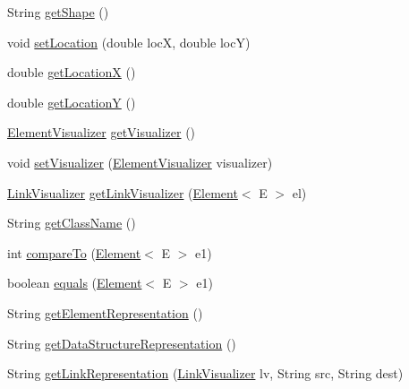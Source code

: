 \begin{DoxyCompactItemize}
\item 
String \mbox{\hyperlink{classbridges_1_1base_1_1_element_aa0fe02d2f5491cf21cc6741f592536a8}{get\+Shape}} ()
\item 
void \mbox{\hyperlink{classbridges_1_1base_1_1_element_a0fe9a52d06e8f3ccc8521e155ec72a27}{set\+Location}} (double locX, double locY)
\item 
double \mbox{\hyperlink{classbridges_1_1base_1_1_element_a57cc1611e0d9cbec9da30d1cdcd3b23d}{get\+LocationX}} ()
\item 
double \mbox{\hyperlink{classbridges_1_1base_1_1_element_a3cfd6af5ca4cae0596845f62018ce004}{get\+LocationY}} ()
\item 
\mbox{\hyperlink{classbridges_1_1base_1_1_element_visualizer}{Element\+Visualizer}} \mbox{\hyperlink{classbridges_1_1base_1_1_element_a42c84d41dfb7bd05a586e303cb33de72}{get\+Visualizer}} ()
\item 
void \mbox{\hyperlink{classbridges_1_1base_1_1_element_a5befa95788099f1bc72cdf5361c55bed}{set\+Visualizer}} (\mbox{\hyperlink{classbridges_1_1base_1_1_element_visualizer}{Element\+Visualizer}} visualizer)
\item 
\mbox{\hyperlink{classbridges_1_1base_1_1_link_visualizer}{Link\+Visualizer}} \mbox{\hyperlink{classbridges_1_1base_1_1_element_a7978552c7b36e28c302f611fc1958e7f}{get\+Link\+Visualizer}} (\mbox{\hyperlink{classbridges_1_1base_1_1_element}{Element}}$<$ E $>$ el)
\item 
String \mbox{\hyperlink{classbridges_1_1base_1_1_element_aa235244426486921bef319a28616bf8b}{get\+Class\+Name}} ()
\item 
int \mbox{\hyperlink{classbridges_1_1base_1_1_element_a6cd4c4f15c6a4f87f59e443cffe87a20}{compare\+To}} (\mbox{\hyperlink{classbridges_1_1base_1_1_element}{Element}}$<$ E $>$ e1)
\item 
boolean \mbox{\hyperlink{classbridges_1_1base_1_1_element_aff10d60700eb1aceca5c0b519bdccccb}{equals}} (\mbox{\hyperlink{classbridges_1_1base_1_1_element}{Element}}$<$ E $>$ e1)
\item 
String \mbox{\hyperlink{classbridges_1_1base_1_1_element_a8822450cfaf8495bc955d777ad35ea3f}{get\+Element\+Representation}} ()
\item 
String \mbox{\hyperlink{classbridges_1_1base_1_1_element_ab5e21b5941c018501db2ab41a6fb3823}{get\+Data\+Structure\+Representation}} ()
\item 
String \mbox{\hyperlink{classbridges_1_1base_1_1_element_ae32deb37d1ad95d2fdfaa616062f319d}{get\+Link\+Representation}} (\mbox{\hyperlink{classbridges_1_1base_1_1_link_visualizer}{Link\+Visualizer}} lv, String src, String dest)

\end{DoxyCompactItemize}
